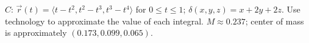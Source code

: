 {$C$: $\vec r(t) = \langle t-t^2,t^2-t^3,t^3-t^4\rangle$ for $0\leq t\leq 1$; $\delta(x,y,z) = x+2y+2z$. Use technology to approximate the value of each integral. 
}
{$M\approx 0.237$; center of mass is approximately $(0.173, 0.099,0.065)$.
}
